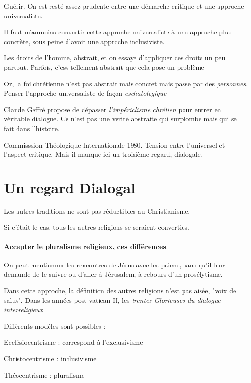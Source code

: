 Guérir.
 On est resté assez prudente entre une démarche critique et une approche universaliste.

Il faut néanmoins convertir cette approche universaliste à une approche plus concrète, sous peine d'avoir une approche inclusiviste.

\begin{Ex}
Les droits de l'homme, abstrait, et on essaye d'appliquer ces droits un peu partout. Parfois, c'est tellement abstrait que cela pose un problème
\end{Ex}
\begin{Synthesis}
Or, la foi chrétienne n'est pas abstrait mais concret mais passe par des \textit{personnes}. Penser l'approche universaliste de façon \textit{eschatologique}

\end{Synthesis}

Claude Geffré  propose de dépasser \textit{l'impérialisme chrétien} pour entrer en véritable dialogue. Ce n'est pas une vérité abstraite qui surplombe mais qui se fait dans l'histoire. 

Commisssion Théologique Internationale 1980. Tension entre l'universel et l'aspect critique. Mais il manque ici un troisième regard, dialogale.

\section{Un regard Dialogal}
\begin{Synthesis}
Les autres traditions ne sont pas réductibles au Christianisme.
\end{Synthesis}



Si c'était le cas, tous les autres religions se seraient converties.

\paragraph{Accepter le pluralisme religieux, ces différences.} On peut mentionner les rencontres de Jésus avec les paiens, sans qu'il leur demande de le suivre ou d'aller à Jérusalem, à rebours d'un prosélytisme. 

Dans cette approche, la définition des autres religions n'est pas aisée, "voix de salut".
Dans les années post vatican II, les \textit{trentes Glorieuses du dialogue interreligieux}


\begin{Def}
Différents modèles sont possibles : 
\bi
\item  
Ecclésiocentrisme : correspond à l'exclusivisme
\item Christocentrisme : inclusivisme
\item Théocentrisme : pluralisme
\ei

\end{Def}

